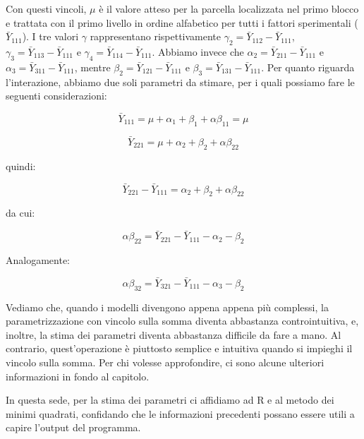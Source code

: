 \documentclass[a4paper,12pt,oneside]{book}
\begin{document}
Con questi vincoli, \(\mu\) è il valore atteso per la parcella localizzata nel primo blocco e trattata con il primo livello in ordine alfabetico per tutti i fattori sperimentali (\(\bar{Y}_{111}\)). I tre valori \(\gamma\) rappresentano rispettivamente \(\gamma_2 = \bar{Y}_{112} - \bar{Y}_{111}\), \(\gamma_3 = \bar{Y}_{113} - \bar{Y}_{111}\) e \(\gamma_4 = \bar{Y}_{114} - \bar{Y}_{111}\). Abbiamo invece che \(\alpha_2 = \bar{Y}_{211} - \bar{Y}_{111}\) e \(\alpha_3 = \bar{Y}_{311} - \bar{Y}_{111}\), mentre \(\beta_2 = \bar{Y}_{121} - \bar{Y}_{111}\) e \(\beta_3 = \bar{Y}_{131} - \bar{Y}_{111}\). Per quanto riguarda l'interazione, abbiamo due soli parametri da stimare, per i quali possiamo fare le seguenti considerazioni:

\[\bar{Y}_{111} = \mu + \alpha_1 + \beta_1 + \alpha\beta_{11} = \mu\]

\[\bar{Y}_{221} = \mu + \alpha_2 + \beta_2 + \alpha\beta_{22}\]

quindi:

\[\bar{Y}_{221} - \bar{Y}_{111} = \alpha_2 + \beta_2 + \alpha\beta_{22}\]

da cui:

\[\alpha\beta_{22} = \bar{Y}_{221} - \bar{Y}_{111} - \alpha_2 - \beta_2\]

Analogamente:

\[\alpha\beta_{32} = \bar{Y}_{321} - \bar{Y}_{111} - \alpha_3 - \beta_2\]

Vediamo che, quando i modelli divengono appena appena più complessi, la parametrizzazione con vincolo sulla somma diventa abbastanza controintuitiva, e, inoltre, la stima dei parametri diventa abbastanza difficile da fare a mano. Al contrario, quest'operazione è piuttosto semplice e intuitiva quando si impieghi il vincolo sulla somma. Per chi volesse approfondire, ci sono alcune ulteriori informazioni in fondo al capitolo.

In questa sede, per la stima dei parametri ci affidiamo ad R e al metodo dei minimi quadrati, confidando che le informazioni precedenti possano essere utili a capire l'output del programma.

\footnotesize
\end{document}
